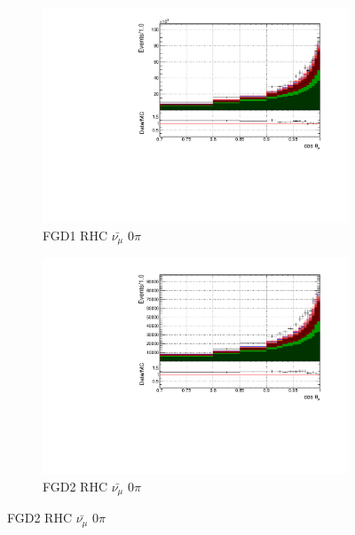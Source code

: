 \begin{figure}[!htbp]
\begin{subfigure}{0.49\textwidth}
  \centering
  \includegraphics[width=\textwidth]{figs/FGD1_anti-numuCC_0pi_t}
  \caption{FGD1 RHC $\bar{\nu_{\mu}}$ 0$\pi$}
\end{subfigure}
\begin{subfigure}{0.49\textwidth}
  \centering
  \includegraphics[width=\textwidth]{figs/FGD2_anti-numuCC_0pi_t}
  \caption{FGD2 RHC $\bar{\nu_{\mu}}$ 0$\pi$}
\end{subfigure}


\end{figure}
